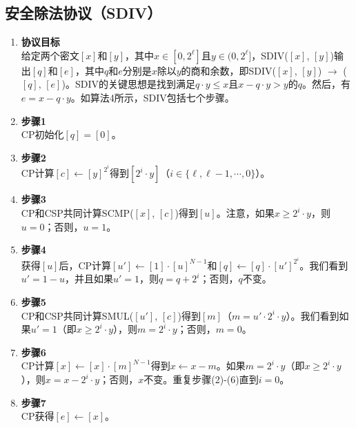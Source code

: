 \subsection{安全除法协议（SDIV）}
\begin{enumerate}[leftmargin=*, nosep]
    \item \textbf{协议目标}  \\
    给定两个密文\([x]\)和\([y]\)，其中\( x \in [0, 2^\ell] \)且\( y \in (0, 2^\ell] \)，SDIV(\([x]\), \([y]\))输出\([q]\)和\([e]\)，其中\( q \)和\( e \)分别是\( x \)除以\( y \)的商和余数，即SDIV(\([x]\), \([y]\)) \(\rightarrow\) (\([q]\), \([e]\))。SDIV的关键思想是找到满足\( q \cdot y \leq x \)且\( x - q \cdot y > y \)的\( q \)。然后，有\( e = x - q \cdot y \)。如算法4所示，SDIV包括七个步骤。
    \item \textbf{步骤1}  \\
    CP初始化\([q] = [0]\)。
    \item \textbf{步骤2}  \\
    CP计算\([c] \leftarrow [y]^{2^i} \)得到\([2^i \cdot y]\)（\( i \in \{ \ell, \ell - 1, \cdots, 0 \} \)）。
    \item \textbf{步骤3}  \\
    CP和CSP共同计算SCMP(\([x]\), \([c]\))得到\([u]\)。注意，如果\( x \geq 2^i \cdot y \)，则\( u = 0 \)；否则，\( u = 1 \)。
    \item \textbf{步骤4}  \\
    获得\([u]\)后，CP计算\([u'] \leftarrow [1] \cdot [u]^{N-1} \)和\([q] \leftarrow [q] \cdot [u']^{2^i} \)。我们看到\( u' = 1 - u \)，并且如果\( u' = 1 \)，则\( q = q + 2^i \)；否则，\( q \)不变。
    \item \textbf{步骤5}  \\
    CP和CSP共同计算SMUL(\([u']\), \([c]\))得到\([m]\)（\( m = u' \cdot 2^i \cdot y \)）。我们看到如果\( u' = 1 \)（即\( x \geq 2^i \cdot y \)），则\( m = 2^i \cdot y \)；否则，\( m = 0 \)。
    \item \textbf{步骤6}  \\
    CP计算\([x] \leftarrow [x] \cdot [m]^{N-1} \)得到\( x \leftarrow x - m \)。如果\( m = 2^i \cdot y \)（即\( x \geq 2^i \cdot y \)），则\( x = x - 2^i \cdot y \)；否则，\( x \)不变。重复步骤(2)-(6)直到\( i = 0 \)。
    \item \textbf{步骤7}  \\
    CP获得\([e] \leftarrow [x]\)。
\end{enumerate}

